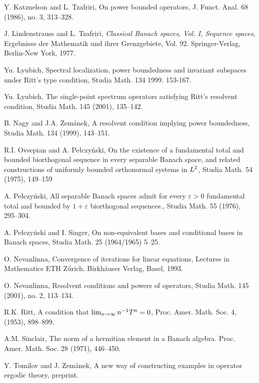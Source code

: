 \documentclass[12pt]{amsart}
\begin{document}
\begin{thebibliography}{999}
Y. Katznelson and L. Tzafriri,
On power bounded operators,
J. Funct. Anal. 68 (1986), no. 3, 313--328.

J. Lindenstrauss and L. Tzafriri, {\it Classical Banach spaces,
Vol. I, Sequence spaces,} Ergebnisse der Mathematik und ihrer
Grenzgebiete, Vol. 92. Springer-Verlag, Berlin-New York, 1977.

Yu. Lyubich,
Spectral localization, power boundedness and invariant subspaces
under Ritt's type condition, Studia Math. 134 1999. 153-167.

Yu. Lyubich,  The single-point spectrum operators satisfying
Ritt's resolvent condition, Studia Math.  145  (2001), 135--142.

B. Nagy and J.A. Zem\'anek, A resolvent condition
implying power boundedness,  Studia Math.  134  (1999), 143--151.

  R.I. Ovsepian and A. Pe\l czy\'nski, On the existence of a fundamental total and
   bounded biorthogonal sequence in every separable Banach space, and related constructions of uniformly
   bounded orthonormal systems in $L\sp{2}$, Studia Math. 54 (1975),  149--159

 A. Pe\l czy\'nski, All separable Banach spaces admit for every
$\varepsilon >0$
   fundamental total and bounded by $1+\varepsilon $ biorthogonal sequences., Studia Math. 55 (1976),
    295--304.

 A. Pe\l czy\'nski and I. Singer,  On non-equivalent bases and
conditional bases in Banach
   spaces, Studia Math. 25 (1964/1965) 5--25.

O. Nevanlinna, Convergence of iterations for linear equations,
Lectures in Mathematics ETH Z\"urich. Birkh\"auser Verlag, Basel, 1993.

O. Nevanlinna, Resolvent conditions and powers of operators,
Studia Math.  145  (2001),  no. 2, 113--134.

R.K. Ritt,  A condition that $\lim\sb {n\to\infty}n\sp {-1}T\sp
n=0$, Proc. Amer. Math. Soc.  4,  (1953), 898--899.

A.M. Sinclair,  The norm of a hermitian element in a Banach
algebra. Proc. Amer. Math. Soc.  28  (1971), 446--450.

Y. Tomilov and J. Zem\'anek, A new way of constructing
examples in operator ergodic theory,  preprint.

\end{thebibliography}
\end{document}
